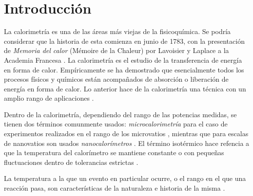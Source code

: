 
%


\newcommand{\keyword}[1]{\textit{#1}}


\section{Introducción}
	La calorimetría es una de las áreas más viejas de la fisicoquímica. Se podría considerar que la historia de esta comienza en junio de 1783, con la presentación de \textit{Memoria del calor} (Mémoire de la Chaleur) por Lavoisier y Laplace a la Academia Francesa \cite{zielenkiewicz2006theory}. La calorimetría es el estudio de la transferencia de energía en forma de calor. Empíricamente se ha demostrado que esencialmente todos los procesos físicos y químicos están acompa\~nados de absorción o liberación de energía en forma de calor. Lo anterior hace de la calorimetría una técnica con un amplio rango de aplicaciones \cite{wadso2001standards}.

	Dentro de la calorimetría, dependiendo del rango de las potencias medidas, se tienen dos términos comunmente usados: \keyword{microcalorimetría} para el caso de experimentos realizados en el rango de los microvatios \cite{wadso2001standards, wadso2003new}, mientras que para escalas de nanovatios son usados \keyword{nanocalorímetros} \cite{wadso2003new}. El término isotérmico hace refencia a que la temperatura del calorímetro se mantiene constante o con peque\~nas fluctuaciones dentro de tolerancias estrictas \cite{wadso2001standards}.
	
	La temperatura a la que un evento en particular ocurre, o el rango en el que una reacción pasa, son características de la naturaleza e historia de la misma \cite{gaisford2016principles}.
	
